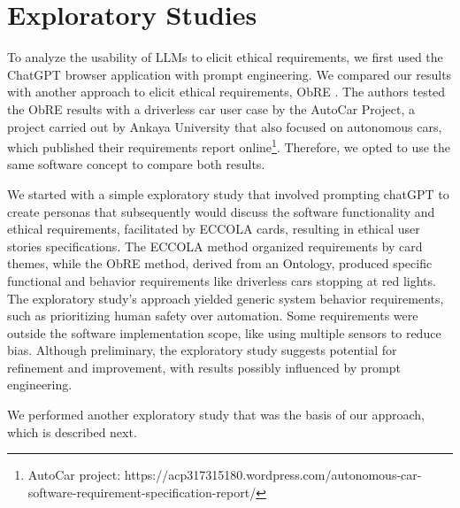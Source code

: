 
%



\chapter{Exploratory Studies}
\label{cha:exploratory_studies}


\epigraphfontsize{\small\itshape}
\setlength\epigraphwidth{12.5cm}
\setlength\epigraphrule{0pt}

To %
analyze the usability of LLMs to elicit ethical requirements, we first used the ChatGPT browser application with prompt engineering. We compared our results with another approach to elicit ethical requirements, ObRE \cite{guizzardi2023ontology}. The authors tested the ObRE results with a driverless car user case by the AutoCar Project, a project carried out by Ankaya University that also focused on autonomous cars, which published their requirements report online\footnote{AutoCar project: https://acp317315180.wordpress.com/autonomous-car-software-requirement-specification-report/}. Therefore, we opted to use the same software concept to compare both results.

We started with a simple exploratory study that involved prompting chatGPT to create personas that subsequently would discuss the software functionality and ethical requirements, facilitated by ECCOLA cards, resulting in ethical user stories specifications. The ECCOLA method \cite{VAKKURI2021111067} organized requirements by card themes, while the ObRE method, derived from an Ontology, produced specific functional and behavior requirements like driverless cars stopping at red lights. The exploratory study's approach yielded generic system behavior requirements, such as prioritizing human safety over automation. Some requirements were outside the software implementation scope, like using multiple sensors to reduce bias. Although preliminary, the exploratory study suggests potential for refinement and improvement, with results possibly influenced by prompt engineering. 

We performed another exploratory study that was the basis of our approach, which is described next.

